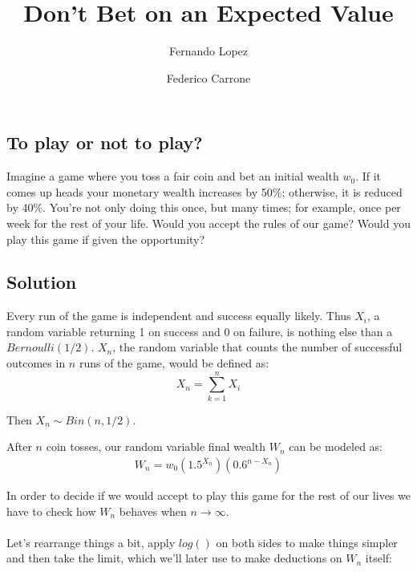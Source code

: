 \documentclass[12pt]{article}
\title{Don't Bet on an Expected Value}
\author{Fernando Lopez \and Federico Carrone}
\begin{document}
\maketitle
{}

\subsection{To play or not to play?}

Imagine a game where you toss a fair coin and bet an initial wealth $w_0$. If it comes up heads your monetary wealth increases by 50\%; otherwise, it is reduced by 40\%. You’re not only doing this once, but many times; for example, once per week for the rest of your life. Would you accept the rules of our game? Would you play this game if given the opportunity?

\subsection{Solution}
Every run of the game is independent and success equally likely. Thus $X_i$, a random variable returning 1 on success and 0 on failure, is nothing else than a $Bernoulli(1/2)$. $X_n$, the random variable that counts the number of successful outcomes in $n$ runs of the game, would be defined as:
\begin{equation*}
 X_n = \sum\limits_{k=1}^{n} X_i
\end{equation*}

Then $X_n \sim Bin(n, 1/2)$.

After $n$ coin tosses, our random variable final wealth $W_n$ can be modeled as:
\begin{align}
  \begin{equation*}
    W_n = w_0 \left(1.5^{X_n}\right)\left(0.6^{n-X_n}\right)
  \end{equation*}
\end{align}

In order to decide if we would accept to play this game for the rest of our lives we have to check how $W_n$ behaves when $n \rightarrow \infty$.
\\\\

Let's rearrange things a bit, apply $log()$ on both sides to make things simpler and then take the limit, which we'll later use to make deductions on $W_n$ itself:
\end{document}

